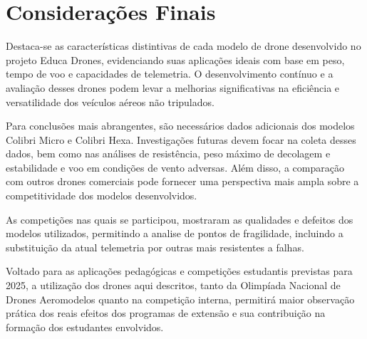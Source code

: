 \documentclass[conference]{IEEEtran}
\begin{document}
\section*{Considerações Finais}

Destaca-se as características distintivas de cada modelo de drone desenvolvido no projeto Educa Drones, evidenciando suas aplicações ideais com base em peso, tempo de voo e capacidades de telemetria. O desenvolvimento contínuo e a avaliação desses drones podem levar a melhorias significativas na eficiência e versatilidade dos veículos aéreos não tripulados.

Para conclusões mais abrangentes, são necessários dados adicionais dos modelos Colibri Micro e Colibri Hexa. Investigações futuras devem focar na coleta desses dados, bem como nas análises de resistência, peso máximo de decolagem e estabilidade e voo em condições de vento adversas. Além disso, a comparação com outros drones comerciais pode fornecer uma perspectiva mais ampla sobre a competitividade dos modelos desenvolvidos.

As competições nas quais se participou, mostraram as qualidades e defeitos dos modelos utilizados,  permitindo a analise de pontos de fragilidade, incluindo a substituição da atual telemetria por outras mais resistentes a falhas.

Voltado para as aplicações pedagógicas e competições estudantis previstas para 2025, a utilização dos drones aqui descritos, tanto da Olimpíada Nacional de Drones Aeromodelos quanto na competição interna, permitirá maior observação prática dos reais efeitos dos programas de extensão e sua contribuição na formação dos estudantes envolvidos.
\end{document}
